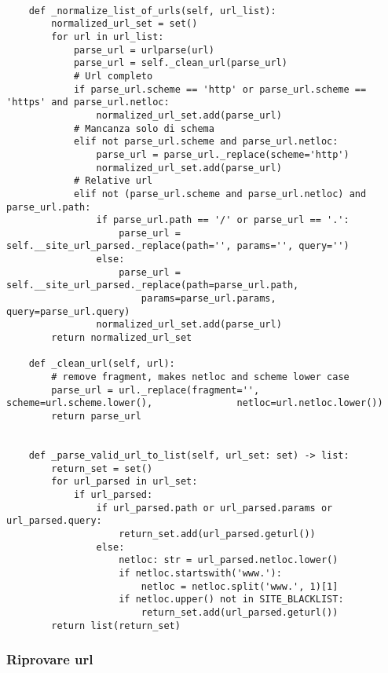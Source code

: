 \begin{lstlisting}[caption=Pulizia completa dell'url.,
	label=listing: pulizia url]
	
    def _normalize_list_of_urls(self, url_list):
        normalized_url_set = set()
        for url in url_list:
            parse_url = urlparse(url)
            parse_url = self._clean_url(parse_url)
            # Url completo
            if parse_url.scheme == 'http' or parse_url.scheme == 'https' and parse_url.netloc:
                normalized_url_set.add(parse_url)
            # Mancanza solo di schema
            elif not parse_url.scheme and parse_url.netloc:
                parse_url = parse_url._replace(scheme='http')
                normalized_url_set.add(parse_url)
            # Relative url
            elif not (parse_url.scheme and parse_url.netloc) and parse_url.path:
                if parse_url.path == '/' or parse_url == '.':
                    parse_url = self.__site_url_parsed._replace(path='', params='', query='')
                else:
                    parse_url = self.__site_url_parsed._replace(path=parse_url.path,
                    	params=parse_url.params, query=parse_url.query)
                normalized_url_set.add(parse_url)
        return normalized_url_set	
	
    def _clean_url(self, url):
        # remove fragment, makes netloc and scheme lower case
        parse_url = url._replace(fragment='', scheme=url.scheme.lower(), 			   netloc=url.netloc.lower())
        return parse_url
        
        
    def _parse_valid_url_to_list(self, url_set: set) -> list:
        return_set = set()
        for url_parsed in url_set:
            if url_parsed:
                if url_parsed.path or url_parsed.params or url_parsed.query:
                    return_set.add(url_parsed.geturl())
                else:
                    netloc: str = url_parsed.netloc.lower()
                    if netloc.startswith('www.'):
                        netloc = netloc.split('www.', 1)[1]
                    if netloc.upper() not in SITE_BLACKLIST:
                        return_set.add(url_parsed.geturl())
        return list(return_set)
\end{lstlisting}


\subsubsection{Riprovare url}

